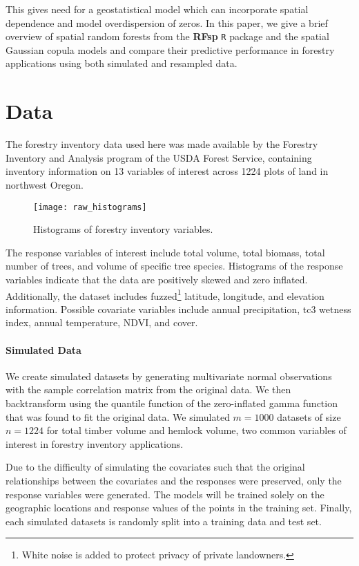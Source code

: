 \documentclass{article}
\begin{document}
This gives need for a geostatistical model which can incorporate spatial dependence and model overdispersion of zeros.
In this paper, we give a brief overview of spatial random forests from the \textbf{RFsp} \texttt{R} package\cite{hengl18} and the spatial Gaussian copula models\cite{madsen09} and compare their predictive performance in forestry applications using both simulated and resampled data.

\section{Data}

The forestry inventory data used here was made available by the Forestry Inventory and Analysis program of the USDA Forest Service, containing inventory information on 13 variables of interest across 1224 plots of land in northwest Oregon.

\begin{wrapfigure}{r}{.49\textwidth}
	\texttt{[image: raw\_histograms]}
	\caption{Histograms of forestry inventory variables.}
\end{wrapfigure}

The response variables of interest include total volume, total biomass, total number of trees, and volume of specific tree species.
Histograms of the response variables indicate that the data are positively skewed and zero inflated.
Additionally, the dataset includes fuzzed\footnote{White noise is added to protect privacy of private landowners.} latitude, longitude, and elevation information.
Possible covariate variables include annual precipitation, tc3 wetness index\cite{raynolds16}, annual temperature, NDVI, and cover.

\paragraph{Simulated Data} We create simulated datasets by generating multivariate normal observations with the sample correlation matrix from the original data.
We then backtransform using the quantile function of the zero-inflated gamma function that was found to fit the original data.
We simulated $m=1000$ datasets of size $n=1224$ for total timber volume and hemlock volume, two common variables of interest in forestry inventory applications.

Due to the difficulty of simulating the covariates such that the original relationships between the covariates and the responses were preserved, only the response variables were generated.
The models will be trained solely on the geographic locations and response values of the points in the training set.
Finally, each simulated datasets is randomly split into a training data and test set.
\end{document}
